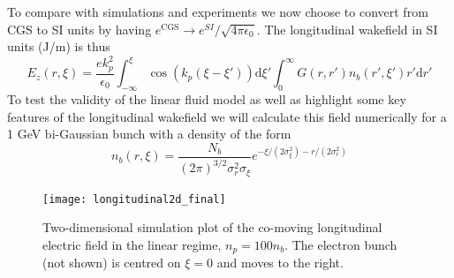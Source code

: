 To compare with simulations and experiments we now choose to convert from CGS to SI units by having $e^{\text{CGS}}\to e^{SI}/\sqrt{4\pi\epsilon_0}$. The longitudinal wakefield in SI units (J/m) is thus
\begin{equation}
E_z(r,\xi)=\frac{e k_p^2}{\epsilon_0} \int_{-\infty}^{\xi} \cos(k_p(\xi-\xi'))\mathrm{d}\xi' \int_{0}^{\infty}G\left(r,r'\right) n_b(r',\xi')r'\mathrm{d}r'
\label{longitudinalforce}
\end{equation}
To test the validity of the linear fluid model as well as highlight some key features of the longitudinal wakefield we will calculate this field numerically for a 1 GeV bi-Gaussian bunch with a density of the form
\begin{equation}
n_b(r,\xi)=\frac{N_b}{(2\pi)^{3/2}\sigma_r^2\sigma_{\xi}}e^{-\xi/(2\sigma_{\xi}^2)-r/(2\sigma_{r}^2)}
\label{bigaussian}
\end{equation}
\begin{figure}[!ht]
\centering
\texttt{[image: longitudinal2d\_final]}
\label{transverse_plot}
\caption{Two-dimensional simulation plot of the co-moving longitudinal electric field in the linear regime, $n_p=100n_b$. The electron bunch (not shown) is centred on $\xi=0$ and moves to the right.}
\end{figure}
\clearpage
